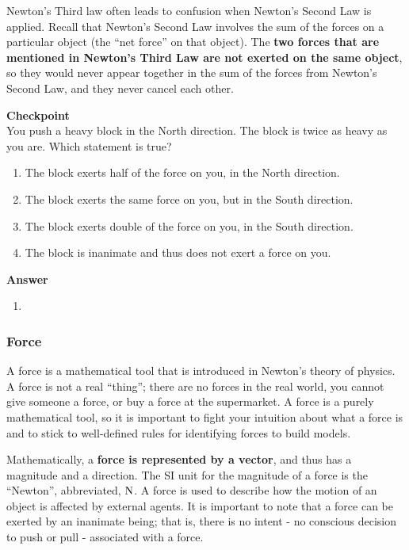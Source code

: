 Newton's Third law often leads to confusion when Newton's Second Law is applied. Recall that Newton's Second Law involves the sum of the forces on a particular object (the ``net force'' on that object). The \textbf{two forces that are mentioned in Newton's Third Law are not exerted on the same object}, so they would never appear together in the sum of the forces from Newton's Second Law, and they never cancel each other.

\begin{framed}
\textbf{Checkpoint}\\
You push a heavy block in the North direction. The block is twice as heavy as you are. Which statement is true?

\begin{enumerate}
\item The block exerts half of the force on you, in the North direction.
\item The block exerts the same force on you, but in the South direction.
\item The block exerts double of the force on you, in the South direction.
\item The block is inanimate and thus does not exert a force on you.
\end{enumerate}

\begin{framed}
\textbf{Answer}\\
\begin{enumerate}[resume]
\item
\end{enumerate}
\end{framed}
\end{framed}

\subsubsection{Force}

A force is a mathematical tool that is introduced in Newton's theory of physics. A force is not a real ``thing''; there are no forces in the real world, you cannot give someone a force, or buy a force at the supermarket. A force is a purely mathematical tool, so it is important to fight your intuition about what a force is and to stick to well-defined rules for identifying forces to build models.

Mathematically, a \textbf{force is represented by a vector}, and thus has a magnitude and a direction. The SI unit for the magnitude of a force is the ``Newton'', abbreviated, ${\rm N}$. A force is used to describe how the motion of an object is affected by external agents. It is important to note that a force can be exerted by an inanimate being; that is, there is no intent - no conscious decision to push or pull - associated with a force.

